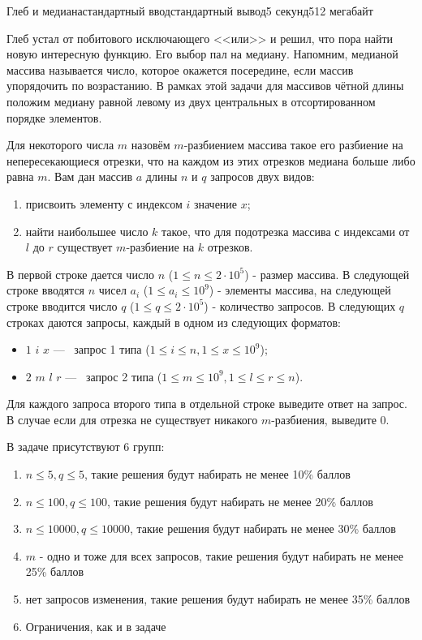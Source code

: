 \begin{problem}{Глеб и медиана}{стандартный ввод}{стандартный вывод}{5 секунд}{512 мегабайт}

Глеб устал от побитового исключающего <<или>>  и решил, что пора найти новую интересную функцию. Его выбор пал на медиану. Напомним, медианой массива называется число, которое окажется посередине, если массив упорядочить по возрастанию. В рамках этой задачи для массивов чётной длины положим медиану равной левому из двух центральных в отсортированном порядке элементов.

Для некоторого числа $m$ назовём $m$-разбиением массива такое его разбиение на непересекающиеся отрезки, что на каждом из этих отрезков медиана больше либо равна $m$. Вам дан массив $a$ длины $n$ и $q$ запросов двух видов:

\begin{enumerate}
\item присвоить элементу с индексом $i$ значение $x$;
\item найти наибольшее число $k$ такое, что для подотрезка массива с индексами от $l$ до $r$ существует $m$-разбиение на $k$ отрезков. 
\end{enumerate}

\InputFile
В первой строке дается число $n$ ($1 \le n \le 2 \cdot 10^5$) - размер массива. В следующей строке вводятся $n$ чисел $a_{i}$ ($1 \le a_{i} \le 10^9$) - элементы массива, на следующей строке вводится число $q$ ($1 \le q \le 2 \cdot 10^5$) - количество запросов. В следующих $q$ строках даются запросы, каждый в одном из следующих форматов:
\begin{itemize}
\item $1$ $i$ $x$ ---~ запрос 1 типа ($1 \le i \le n, 1 \le x \le 10^9$);
\item $2$ $m$ $l$ $r$ ---~ запрос 2 типа ($1 \le m \le 10^9, 1 \le l \le r \le n$).
\end{itemize}

\OutputFile
Для каждого запроса второго типа в отдельной строке выведите ответ на запрос. В случае если для отрезка не существует никакого $m$-разбиения, выведите $0$.

\Scoring
В задаче присутствуют 6 групп:
\begin{enumerate}
\item $n \le 5, q \le 5$, такие решения будут набирать не менее 10\% баллов
\item $n \le 100, q \le 100$, такие решения будут набирать не менее 20\% баллов
\item $n \le 10000, q \le 10000$, такие решения будут набирать не менее 30\% баллов
\item $m$ - одно и тоже для всех запросов, такие решения будут набирать не менее 25\% баллов
\item нет запросов изменения, такие решения будут набирать не менее 35\% баллов
\item Ограничения, как и в задаче
\end{enumerate}

\Example

\begin{example}
%
\end{example}

\end{problem}

